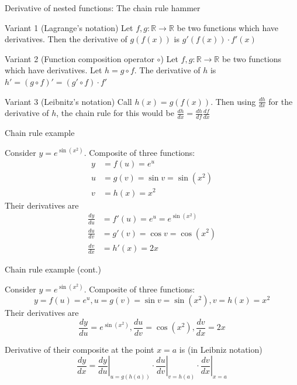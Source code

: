 \documentclass[12pt,aspectratio=169]{beamer}
\begin{document}
\begin{frame}{Derivative of nested functions: The chain rule hammer}


\begin{block}{Variant 1 (Lagrange's notation)}
Let $f, g : \mathbb{R} \to \mathbb{R}$ be two functions which have derivatives. Then the derivative of $g (f(x))$ is $g' (f(x)) \cdot f' (x)$
\end{block}
\pause

\begin{block}{Variant 2 (Function composition operator $\circ$)}
Let $f, g : \mathbb{R} \to \mathbb{R}$ be two functions which have derivatives. Let $h = g \circ f$. The derivative of $h$ is $h'=(g \circ f)'=(g'\circ f)\cdot f'$
\end{block}
\pause

\begin{block}{Variant 3 (Leibnitz's notation)}
Call $h(x) = g(f(x))$. Then using $\frac{dh}{dx}$ for the derivative of $h$, the chain rule for this would be $\frac{dh}{dx} = \frac{dh}{df} \frac{df}{dx}$
\end{block}

\end{frame}


\begin{frame}{Chain rule example}

Consider $y=e^{\sin(x^{2})}$. Composite of three functions:
$$
\begin{aligned}
y &= f(u) = e^u \\
u &= g(v) = \sin v = \sin (x^2) \\
v &= h(x) = x^2
\end{aligned}
$$
\pause
Their derivatives are
$$
\begin{aligned}
\frac{dy}{du} &= f'(u) = e^u = e^{\sin(x^{2})} \\
\frac{du}{dv} &= g'(v) = \cos v = \cos (x^2) \\
\frac{dv}{dx} &= h'(x) = 2x
\end{aligned}
$$
\end{frame}


\begin{frame}{Chain rule example (cont.)}
	
Consider $y=e^{\sin(x^{2})}$. Composite of three functions:
$$y = f(u) = e^u, u = g(v) = \sin v = \sin (x^2), v = h(x) = x^2$$
Their derivatives are
$$\frac{dy}{du} = e^{\sin(x^{2})}, \frac{du}{dv} = \cos (x^2), \frac{dv}{dx} = 2x$$

\pause

Derivative of their composite at the point $x = a$ is (in Leibniz notation)
$$
{\frac {dy}{dx}}=\left.{\frac {dy}{du}}\right|_{u=g(h(a))}\cdot \left.{\frac {du}{dv}}\right|_{v=h(a)}\cdot \left.{\frac {dv}{dx}}\right|_{x=a}
$$
	
\end{frame}
\end{document}
